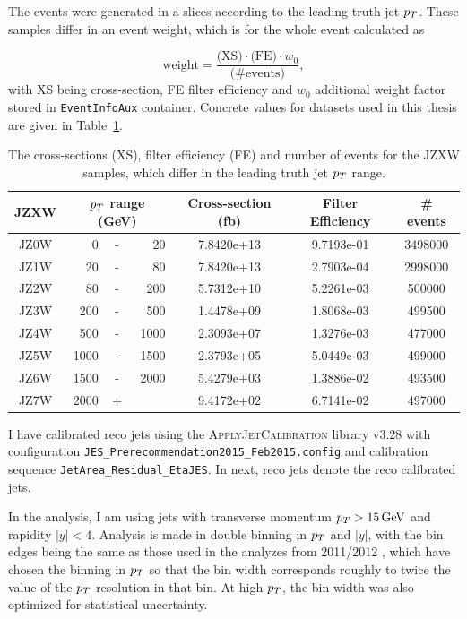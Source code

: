 The events were generated in a slices according to the leading truth jet $p_{T}$. These
samples differ in an event weight, which is for the whole event calculated as 

\begin{equation}
  \text{weight} = \frac{\text{(XS)} \cdot \text{(FE)} \cdot w_0}{\text{(\# events)}},
\end{equation}
with XS being cross-section, FE filter efficiency and $w_0$ additional weight
factor stored in \texttt{EventInfoAux} container. Concrete values for datasets used in
this thesis are given in Table~\ref{tab:JZXW}.  

\begin{table}
  \centering
  \begin{tabular}{|c|rcr|c|c|c|}
    \hline 
     JZXW & \multicolumn{3}{|c|}{$p_{T}$ range (GeV)} & Cross-section (fb) & Filter Efficiency & \# events  \\ 
    \hline
    \hline
		 JZ0W &     0 & - &    20 & 7.8420e+13 & 9.7193e-01 & 3498000 \\ 
    \hline
		 JZ1W &    20 & - &    80 & 7.8420e+13 & 2.7903e-04 & 2998000 \\
    \hline
		 JZ2W &    80 & - &   200 & 5.7312e+10 & 5.2261e-03 & 500000  \\
    \hline
		 JZ3W &   200 & - &   500 & 1.4478e+09 & 1.8068e-03 & 499500  \\
    \hline
		 JZ4W &   500 & - &  1000 & 2.3093e+07 & 1.3276e-03 & 477000  \\
    \hline
		 JZ5W &  1000 & - &  1500 & 2.3793e+05 & 5.0449e-03 & 499000  \\
    \hline
		 JZ6W &  1500 & - &  2000 & 5.4279e+03 & 1.3886e-02 & 493500  \\
    \hline
		 JZ7W &  2000 & + &       & 9.4172e+02 & 6.7141e-02 & 497000  \\
    \hline 
  \end{tabular}
  \caption{The cross-sections (XS), filter efficiency (FE) and number of events
  for the JZXW samples, which differ in the leading truth jet $p_{T}$ range.}
  \label{tab:JZXW}
\end{table}

I have calibrated reco jets using the \textsc{ApplyJetCalibration}
\cite{ApplyJetCalibration} library v3.28 with configuration 
\texttt{JES\_Prerecommendation2015\_Feb2015.config} and
calibration sequence \texttt{JetArea\_Residual\_EtaJES}. In next, reco jets
denote the reco calibrated jets.

In the analysis, I am using jets with transverse momentum $p_{T}>15\,\text{GeV}$ and
rapidity $|y|<4$. Analysis is made in double binning in $p_{T}$ and $|y|$, with
the bin edges being the same as those used in the analyzes from 2011/2012 \cite{Analysis2012},
which have chosen the binning in $p_{T}$ so that the bin width corresponds roughly
to twice the value of the $p_{T}$ resolution in that bin. At high $p_{T}$, the bin
width was also optimized for statistical uncertainty.

